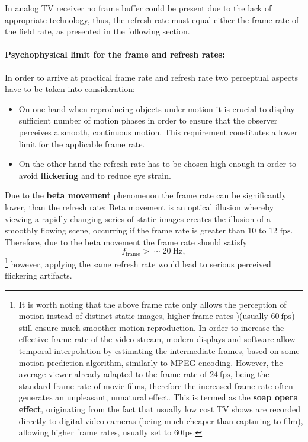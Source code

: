 In analog TV receiver no frame buffer could be present due to the lack of appropriate technology, thus, the refresh rate must equal either the frame rate of the field rate, as presented in the following section. 

\paragraph*{Psychophysical limit for the frame and refresh rates:}

In order to arrive at practical frame rate and refresh rate two perceptual aspects have to be taken into consideration:
\begin{itemize}
\item On one hand when reproducing objects under motion it is crucial to display sufficient number of motion phases in order to ensure that the observer perceives a smooth, continuous motion.
This requirement constitutes a lower limit for the applicable frame rate.
\item On the other hand the refresh rate has to be chosen high enough in order to avoid \textbf{flickering} and to reduce eye strain.
\end{itemize}
Due to the \textbf{beta movement} phenomenon the frame rate can be significantly lower, than the refresh rate:
Beta movement is an optical illusion whereby viewing a rapidly changing series of static images creates the illusion of a smoothly flowing scene, occurring if the frame rate is greater than 10 to 12 $\mathrm{fps}$. 
Therefore, due to the beta movement the frame rate should satisfy
\begin{equation}
f_{\mathrm{frame}} > \sim20~\mathrm{Hz},
\end{equation}
\footnote{
It is worth noting that the above frame rate only allows the perception of motion instead of distinct static images, higher frame rates )(usually $60~\mathrm{fps}$) still ensure much smoother motion reproduction.
In order to increase the effective frame rate of the video stream, modern displays and software allow temporal interpolation by estimating the intermediate frames, based on some motion prediction algorithm, similarly to MPEG encoding.
However, the average viewer already adapted to the frame rate of $24~\mathrm{fps}$, being the standard frame rate of movie films, therefore the increased frame rate often generates an unpleasant, unnatural effect.
This is termed as the \textbf{soap opera effect}, originating from the fact that usually low cost TV shows are recorded directly to digital video cameras (being much cheaper than capturing to film), allowing higher frame rates, usually set to $60 \mathrm{fps}$.}
however, applying the same refresh rate would lead to serious perceived flickering artifacts.

